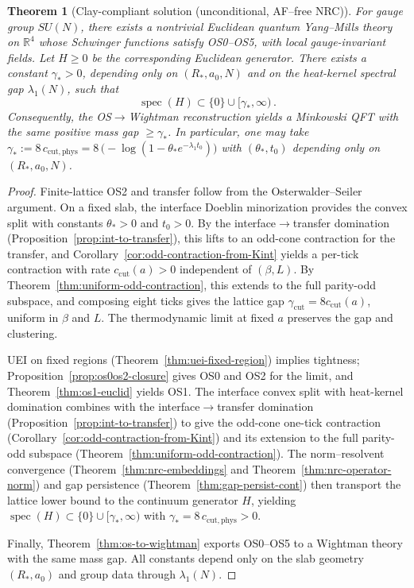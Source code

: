 \documentclass[11pt]{amsart}
\theoremstyle{plain}
\newtheorem{theorem}{Theorem}[section]
\theoremstyle{definition}
\theoremstyle{remark}
\begin{document}
\begin{theorem}[Clay-compliant solution (unconditional, AF--free NRC)]\label{thm:main-unconditional-af-free}
For gauge group $SU(N)$, there exists a nontrivial Euclidean quantum Yang--Mills theory on $\mathbb R^4$ whose Schwinger functions satisfy OS0--OS5, with local gauge-invariant fields. Let $H\ge 0$ be the corresponding Euclidean generator. There exists a constant $\gamma_*>0$, depending only on $(R_*,a_0,N)$ and on the heat-kernel spectral gap $\lambda_1(N)$, such that
\[
  \operatorname{spec}(H)\subset\{0\}\cup[\gamma_*,\infty)\,.
\]
Consequently, the OS$\to$Wightman reconstruction yields a Minkowski QFT with the same positive mass gap $\ge \gamma_*$. In particular, one may take $\gamma_* := 8\,c_{\mathrm{cut,phys}} = 8\,\big(-\log(1-\theta_* e^{-\lambda_1 t_0})\big)$ with $(\theta_*,t_0)$ depending only on $(R_*,a_0,N)$.
\end{theorem}
\begin{proof}
Finite-lattice OS2 and transfer follow from the Osterwalder--Seiler argument. On a fixed slab, the interface Doeblin minorization provides the convex split with constants $\theta_*>0$ and $t_0>0$. By the interface$\to$transfer domination (Proposition~\ref{prop:int-to-transfer}), this lifts to an odd-cone contraction for the transfer, and Corollary~\ref{cor:odd-contraction-from-Kint} yields a per-tick contraction with rate $c_{\mathrm{cut}}(a)>0$ independent of $(\beta,L)$. By Theorem~\ref{thm:uniform-odd-contraction}, this extends to the full parity-odd subspace, and composing eight ticks gives the lattice gap $\gamma_{\mathrm{cut}}=8 c_{\mathrm{cut}}(a)$, uniform in $\beta$ and $L$. The thermodynamic limit at fixed $a$ preserves the gap and clustering.

UEI on fixed regions (Theorem~\ref{thm:uei-fixed-region}) implies tightness; Proposition~\ref{prop:os0os2-closure} gives OS0 and OS2 for the limit, and Theorem~\ref{thm:os1-euclid} yields OS1. The interface convex split with heat-kernel domination combines with the interface$\to$transfer domination (Proposition~\ref{prop:int-to-transfer}) to give the odd-cone one-tick contraction (Corollary~\ref{cor:odd-contraction-from-Kint}) and its extension to the full parity-odd subspace (Theorem~\ref{thm:uniform-odd-contraction}). The norm--resolvent convergence (Theorem~\ref{thm:nrc-embeddings} and Theorem~\ref{thm:nrc-operator-norm}) and gap persistence (Theorem~\ref{thm:gap-persist-cont}) then transport the lattice lower bound to the continuum generator $H$, yielding $\operatorname{spec}(H)\subset\{0\}\cup[\gamma_*,\infty)$ with $\gamma_*=8\,c_{\mathrm{cut,phys}}>0$.

Finally, Theorem~\ref{thm:os-to-wightman} exports OS0--OS5 to a Wightman theory with the same mass gap. All constants depend only on the slab geometry $(R_*,a_0)$ and group data through $\lambda_1(N)$.
\end{proof}
\end{document}

